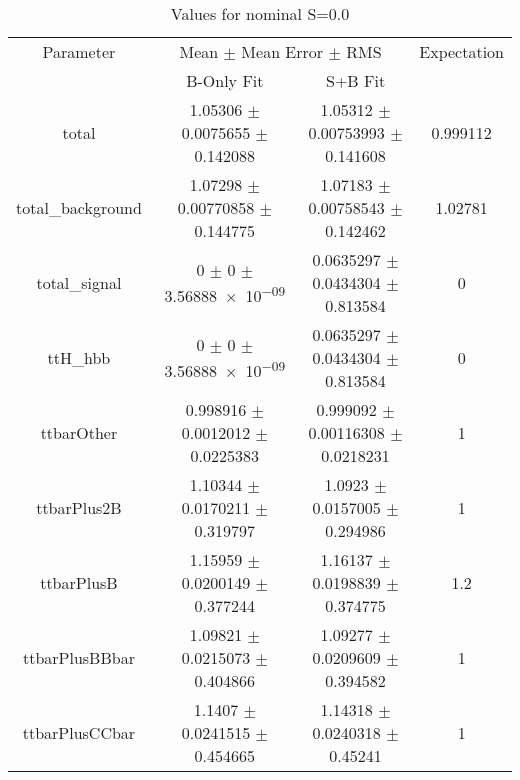 \begin{table}
\centering
\caption{Values for nominal S=0.0}
\begin{tabular}{cccc}
\toprule
Parameter & \multicolumn{2}{c}{Mean $\pm$ Mean Error $\pm$ RMS} & Expectation\\
 & B-Only Fit & S+B Fit & \\
\midrule
total & \num{1.05306} $\pm$ \num{0.0075655} $\pm$ \num{0.142088} & \num{1.05312} $\pm$ \num{0.00753993} $\pm$ \num{0.141608} & \num{0.999112}\\
total\_background & \num{1.07298} $\pm$ \num{0.00770858} $\pm$ \num{0.144775} & \num{1.07183} $\pm$ \num{0.00758543} $\pm$ \num{0.142462} & \num{1.02781}\\
total\_signal & \num{0} $\pm$ \num{0} $\pm$ \num{3.56888e-09} & \num{0.0635297} $\pm$ \num{0.0434304} $\pm$ \num{0.813584} & \num{0}\\
ttH\_hbb & \num{0} $\pm$ \num{0} $\pm$ \num{3.56888e-09} & \num{0.0635297} $\pm$ \num{0.0434304} $\pm$ \num{0.813584} & \num{0}\\
ttbarOther & \num{0.998916} $\pm$ \num{0.0012012} $\pm$ \num{0.0225383} & \num{0.999092} $\pm$ \num{0.00116308} $\pm$ \num{0.0218231} & \num{1}\\
ttbarPlus2B & \num{1.10344} $\pm$ \num{0.0170211} $\pm$ \num{0.319797} & \num{1.0923} $\pm$ \num{0.0157005} $\pm$ \num{0.294986} & \num{1}\\
ttbarPlusB & \num{1.15959} $\pm$ \num{0.0200149} $\pm$ \num{0.377244} & \num{1.16137} $\pm$ \num{0.0198839} $\pm$ \num{0.374775} & \num{1.2}\\
ttbarPlusBBbar & \num{1.09821} $\pm$ \num{0.0215073} $\pm$ \num{0.404866} & \num{1.09277} $\pm$ \num{0.0209609} $\pm$ \num{0.394582} & \num{1}\\
ttbarPlusCCbar & \num{1.1407} $\pm$ \num{0.0241515} $\pm$ \num{0.454665} & \num{1.14318} $\pm$ \num{0.0240318} $\pm$ \num{0.45241} & \num{1}\\
\bottomrule
\end{tabular}
\end{table}
